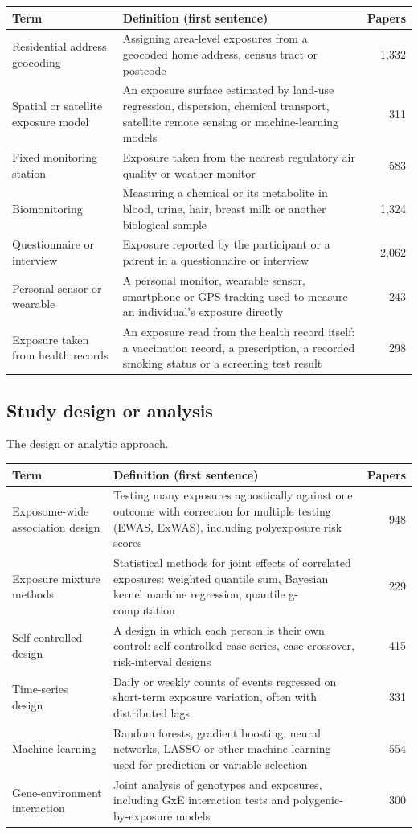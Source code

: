 \documentclass[10pt]{article}
\begin{document}
\begin{longtable}{@{}P{3.6cm}P{9.4cm}r@{}}\toprule Term & Definition (first sentence) & Papers\\\midrule\endhead
Residential address geocoding & Assigning area-level exposures from a geocoded home address, census tract or postcode & 1,332\\
Spatial or satellite exposure model & An exposure surface estimated by land-use regression, dispersion, chemical transport, satellite remote sensing or machine-learning models & 311\\
Fixed monitoring station & Exposure taken from the nearest regulatory air quality or weather monitor & 583\\
Biomonitoring & Measuring a chemical or its metabolite in blood, urine, hair, breast milk or another biological sample & 1,324\\
Questionnaire or interview & Exposure reported by the participant or a parent in a questionnaire or interview & 2,062\\
Personal sensor or wearable & A personal monitor, wearable sensor, smartphone or GPS tracking used to measure an individual's exposure directly & 243\\
Exposure taken from health records & An exposure read from the health record itself: a vaccination record, a prescription, a recorded smoking status or a screening test result & 298\\
\bottomrule\end{longtable}
\subsection{Study design or analysis}
The design or analytic approach.

\begin{longtable}{@{}P{3.6cm}P{9.4cm}r@{}}\toprule Term & Definition (first sentence) & Papers\\\midrule\endhead
Exposome-wide association design & Testing many exposures agnostically against one outcome with correction for multiple testing (EWAS, ExWAS), including polyexposure risk scores & 948\\
Exposure mixture methods & Statistical methods for joint effects of correlated exposures: weighted quantile sum, Bayesian kernel machine regression, quantile g-computation & 229\\
Self-controlled design & A design in which each person is their own control: self-controlled case series, case-crossover, risk-interval designs & 415\\
Time-series design & Daily or weekly counts of events regressed on short-term exposure variation, often with distributed lags & 331\\
Machine learning & Random forests, gradient boosting, neural networks, LASSO or other machine learning used for prediction or variable selection & 554\\
Gene-environment interaction & Joint analysis of genotypes and exposures, including GxE interaction tests and polygenic-by-exposure models & 300\\
\bottomrule\end{longtable}
\end{document}

